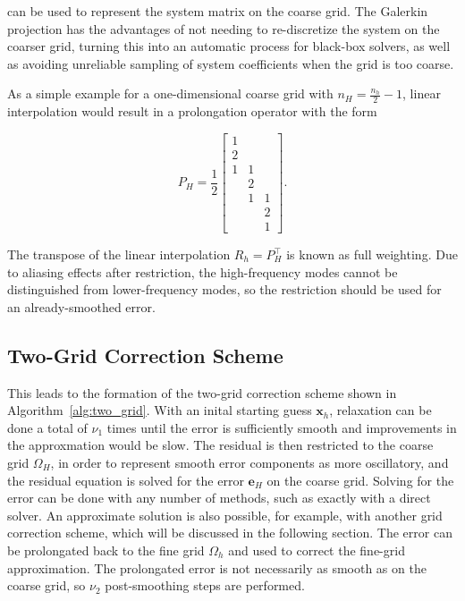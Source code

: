 can be used to represent the system matrix on the coarse grid. The Galerkin projection has the advantages of not needing to re-discretize the system on the coarser grid, turning this into an automatic process for black-box solvers, as well as avoiding unreliable sampling of system coefficients when the grid is too coarse.

As a simple example for a one-dimensional coarse grid with $n_H = \frac{n_h}{2} - 1$, linear interpolation would result in a prolongation operator with the form

\begin{equation}
	P_H = \frac{1}{2}\begin{bmatrix}
		1 &   &   \\
		2 &   &   \\
		1 & 1 &   \\
		  & 2 &   \\
		  & 1 & 1 \\
		  &   & 2 \\
		  &   & 1
	\end{bmatrix}.
\end{equation}

The transpose of the linear interpolation $R_h = P_H^\top$ is known as full weighting. Due to aliasing effects after restriction, the high-frequency modes cannot be distinguished from lower-frequency modes, so the restriction should be used for an already-smoothed error.

\subsection{Two-Grid Correction Scheme}

This leads to the formation of the two-grid correction scheme shown in Algorithm~\ref{alg:two_grid}. With an inital starting guess $\mathbf{x}_h$, relaxation can be done a total of $\nu_1$ times until the error is sufficiently smooth and improvements in the approxmation would be slow. The residual is then restricted to the coarse grid $\Omega_H$, in order to represent smooth error components as more oscillatory, and the residual equation is solved for the error $\mathbf{e}_H$ on the coarse grid. Solving for the error can be done with any number of methods, such as exactly with a direct solver. An approximate solution is also possible, for example, with another grid correction scheme, which will be discussed in the following section. The error can be prolongated back to the fine grid $\Omega_h$ and used to correct the fine-grid approximation. The prolongated error is not necessarily as smooth as on the coarse grid, so $\nu_2$ post-smoothing steps are performed.

